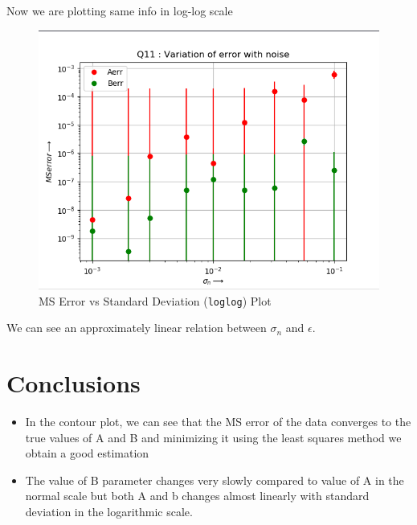 \documentclass[11pt, a4paper]{article}
\begin{document}
            Now we are plotting same info in log-log scale 
            \begin{figure}[H]
                \centering
                \includegraphics[scale=0.5]{q11_plot.png}  %
                \caption{MS Error vs Standard Deviation (\texttt{loglog}) Plot}
                \label{fig:errorSTDloglog}
            \end{figure}

            We can see an approximately linear relation between $\sigma_n$ and $\epsilon$.

    \section{Conclusions}
    \begin{itemize}
    \item In the contour plot, we can see that the MS error of the data converges to the
    true values of A and B and minimizing it using the least squares method we obtain a good estimation
    \item The value of B parameter changes very slowly compared to value of A in the normal
    scale but both A and b changes almost linearly with standard deviation in the logarithmic scale.
    \end{itemize}
    
\end{document}

